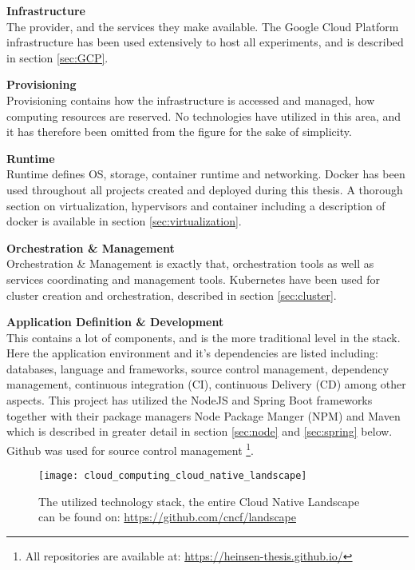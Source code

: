 \textbf{Infrastructure} \\
The provider, and the services they make available. The Google Cloud Platform infrastructure has been used extensively to host all experiments, and is described in section \ref{sec:GCP}.

\textbf{Provisioning}\\ 
Provisioning contains how the infrastructure is accessed and managed, how computing resources are reserved. No technologies have utilized in this area, and it has therefore been omitted from the figure for the sake of simplicity.
 
\textbf{Runtime}\\
Runtime defines OS, storage, container runtime and networking. Docker has been used throughout all projects created and deployed during this thesis. A thorough section on virtualization, hypervisors and container including a description of docker is available in section \ref{sec:virtualization}.
 
\textbf{Orchestration \& Management}\\
Orchestration \& Management is exactly that, orchestration tools as well as services coordinating and management tools. Kubernetes have been used for cluster creation and orchestration, described in section \ref{sec:cluster}. 
 
\textbf{Application Definition \& Development}\\
This contains a lot of components, and is the more traditional level in the stack. Here the application environment and it's dependencies are listed including: databases, language and frameworks, source control management, dependency management, continuous integration (CI), continuous Delivery (CD) among other aspects. This project has utilized the NodeJS and Spring Boot frameworks together with their package managers Node Package Manger (NPM) and Maven which is described in greater detail in section \ref{sec:node} and \ref{sec:spring} below. Github was used for source control management \footnote{All repositories are available at: \url{https://heinsen-thesis.github.io/}}.

\begin{figure}[!htb]
\begin{center}
  \texttt{[image: cloud\_computing\_cloud\_native\_landscape]}  
  \caption{The utilized technology stack, the entire Cloud Native Landscape can be found on: \url{https://github.com/cncf/landscape}}
  \label{fig:cloud_computing_cloud_native_landscape}
\end{center}
\end{figure}


